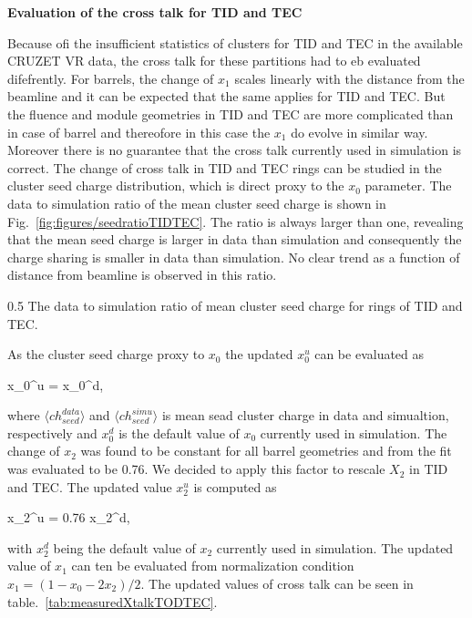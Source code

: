 \textbf{Evaluation of the cross talk for TID and TEC}



Because ofi the insufficient statistics of clusters for TID and TEC in the available CRUZET VR data, the cross talk for these partitions had to eb evaluated difefrently. For barrels, the change of $x_{1}$ scales linearly with the distance from the beamline and it can be expected that the same applies for TID and TEC. But the fluence and module geometries in TID and TEC are more complicated than in case of barrel and thereofore in this case the $x_{1}$ do evolve in similar way. Moreover there is no guarantee that the cross talk currently used in simulation is correct.  The change of cross talk in TID and TEC rings can be studied in the cluster seed charge distribution, which is direct proxy to the $x_{0}$ parameter. The data to simulation ratio of the mean cluster seed charge is shown in Fig.~\ref{fig:figures/seedratioTIDTEC}. The ratio is always larger than one, revealing that the mean seed charge is larger in data than simulation and consequently the charge sharing is smaller in data than simulation. No clear trend as a function of distance from beamline is observed in this ratio.

                 {0.5}       %
                 {The data to simulation ratio of mean cluster seed charge for rings of TID and TEC.}

As the cluster seed charge proxy to $x_{0}$ the updated $x_{0}^{u}$ can be evaluated as

{
x_{0}^{u} = x_{0}^{d},
}

where $\langle ch_{seed}^{data} \rangle$ and $\langle ch_{seed}^{simu} \rangle$ is mean sead cluster charge in data and simualtion, respectively and $x_{0}^{d}$ is the default value of $x_{0}$ currently used in simulation. The change of $x_{2}$ was found to be constant for all barrel geometries and from the fit was evaluated to be 0.76. We decided to apply this factor to rescale $X_{2}$ in TID and TEC. The updated value $x_{2}^{u}$ is computed as 

{
x_{2}^{u} = 0.76  x_{2}^{d},
}

with  $x_{2}^{d}$ being the default value of $x_{2}$ currently used in simulation. The updated value of $x_{1}$ can ten be evaluated from normalization condition $x_{1} = (1-x_{0}-2x_{2})/2$. The updated values of cross talk can be seen in table.~\ref{tab:measuredXtalkTODTEC}.

